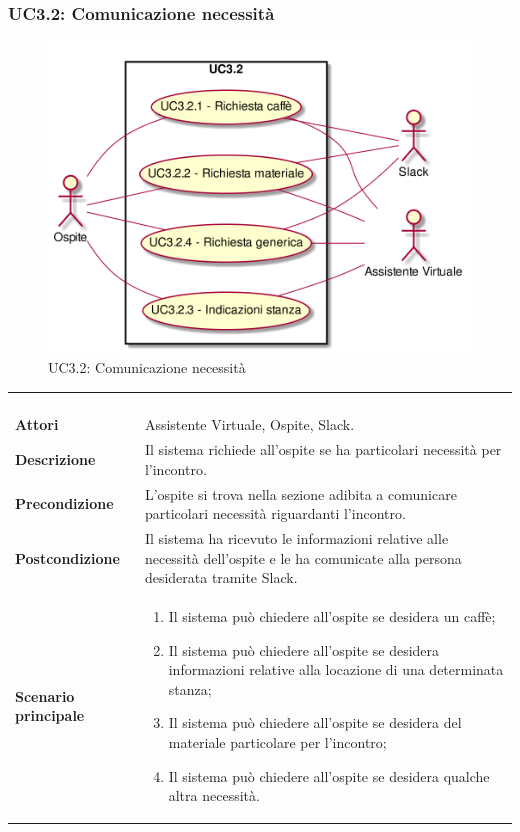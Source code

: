 \newpage\subsubsection{UC3.2: Comunicazione necessità}
\label{UC3.2}
\begin{figure}[h]
\centering
\includegraphics[width=\textwidth,height=\textheight,keepaspectratio]{images/UseCaseUC32.png}
\caption{UC3.2: Comunicazione necessità}
\end{figure}
\begin{longtable}{l|p{10cm}}
\rowcolor[gray]{0.8} \multicolumn{2}{c}{} \\
\rowcolor[gray]{0.8} \multicolumn{2}{c}{\textbf{UC3.2 - Comunicazione necessità}} \\
\rowcolor[gray]{0.8} \multicolumn{2}{c}{} \\
\hline
&\\
\textbf{Attori} & Assistente Virtuale, Ospite, Slack.\\[7pt]
\textbf{Descrizione} & Il sistema richiede all'ospite se ha particolari necessità per l'incontro.\\[7pt]
\textbf{Precondizione} & L'ospite si trova nella sezione adibita a comunicare particolari necessità riguardanti l'incontro.\\[7pt]
\textbf{Postcondizione} & Il sistema ha ricevuto le informazioni relative alle necessità dell'ospite e le ha comunicate alla persona desiderata tramite Slack.\\[7pt]
\textbf{Scenario principale} &\begin{enumerate}
\item  Il sistema può chiedere all'ospite se desidera un caffè;
\item  Il sistema può chiedere all'ospite se desidera informazioni relative alla locazione di una determinata stanza; 
\item  Il sistema può chiedere all'ospite se desidera del materiale particolare per l'incontro;
\item  Il sistema può chiedere all'ospite se desidera qualche altra necessità.
\end{enumerate}
\\[7pt]\hline
\end{longtable}

